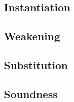 \subsection{Instantiation}


\subsection{Weakening}


\subsection{Substitution}


\subsection{Soundness}
